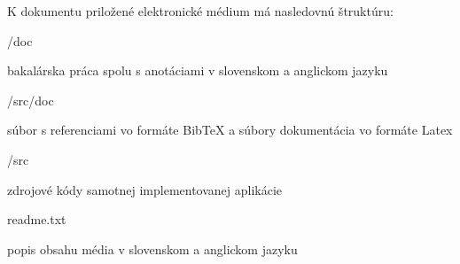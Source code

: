 K dokumentu priložené elektronické médium má nasledovnú štruktúru:
\begin{my_itemize}

\emptyitem /doc
    \begin{my_itemize}
    \myitem bakalárska práca spolu s anotáciami v slovenskom a anglickom jazyku
    \end{my_itemize}

\emptyitem /src/doc
    \begin{my_itemize}
    \myitem súbor s referenciami vo formáte BibTeX a súbory dokumentácia vo formáte Latex
    \end{my_itemize}

\emptyitem /src
    \begin{my_itemize}
    \myitem zdrojové kódy samotnej implementovanej aplikácie
    \end{my_itemize}

\emptyitem readme.txt
    \begin{my_itemize}
    \myitem popis obsahu média v slovenskom a anglickom jazyku
    \end{my_itemize}
\end{my_itemize}
